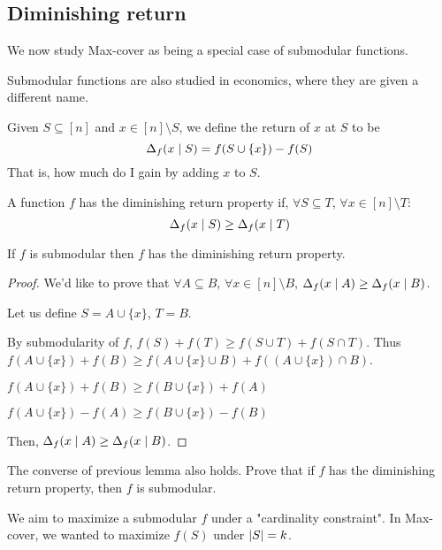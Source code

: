 \subsection{Diminishing return}
    We now study Max-cover as being a special case of submodular functions.

    Submodular functions are also studied in economics, where they are given a different name.
    \begin{definition}
        Given $S \subseteq [n]$ and $x \in [n] \setminus S$, we define the return of $x$ at $S$ to be
        \[ \Delta_f (x \; \vert \; S) = f(S \cup \{ x \}) - f(S) \]
        That is, how much do I gain by adding $x$ to $S$.
    \end{definition}

    A function $f$ has the diminishing return property if, $\forall S \subseteq T$, $\forall x \in [n] \setminus T$:
    \[ \Delta_f(x \; \vert \; S) \geq \Delta_f(x \; \vert \; T) \]

    \begin{lemma}
        If $f$ is submodular then $f$ has the diminishing return property.
    \end{lemma}

    \begin{proof}
        We'd like to prove that $\forall A \subseteq B$, $\forall x \in [n] \setminus B$, $\Delta_f(x \; \vert \; A) \geq \Delta_f(x \; \vert \; B)$.

        Let us define $S = A \cup \{x\}$, $T = B$.

        By submodularity of $f$, $f(S) + f(T) \geq f(S \cup T) + f(S \cap T)$.
        Thus $f(A \cup \{x\}) + f(B) \geq f(A \cup \{x\} \cup B) + f((A \cup \{x\}) \cap B)$.

        $f(A \cup \{x\}) + f(B) \geq f(B \cup \{x\}) + f(A)$

        $f(A \cup \{x\}) - f(A) \geq f(B \cup \{x\}) - f(B)$

        Then, $\Delta_f(x \; \vert \; A) \geq \Delta_f(x \; \vert \; B)$.
    \end{proof}

    \begin{exercise}
        The converse of previous lemma also holds.
        Prove that if $f$ has the diminishing return property, then $f$ is submodular.
    \end{exercise}

    We aim to maximize a submodular $f$ under a "cardinality constraint".
    In Max-cover, we wanted to maximize $f(S)$ under $\vert S \vert = k$.

